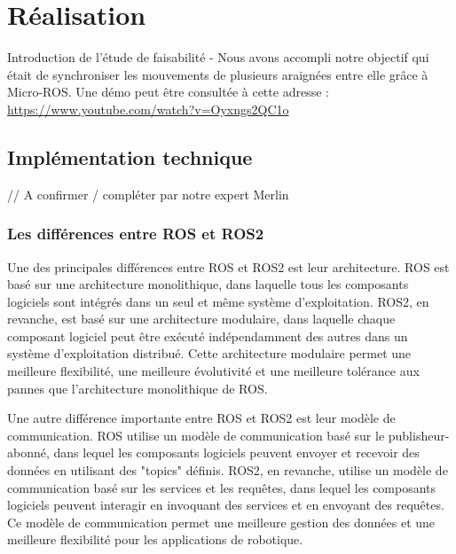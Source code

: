 	\chapter{Réalisation}

Introduction de l'étude de faisabilité - Nous avons accompli notre objectif qui était de synchroniser les mouvements de plusieurs araignées entre elle grâce à Micro-ROS.
Une démo peut être consultée à cette adresse : \url{https://www.youtube.com/watch?v=Oyxngs2QC1o}

	
		\section{Implémentation technique}

// A confirmer / compléter par notre expert Merlin

			\subsection{Les différences entre ROS et ROS2}

Une des principales différences entre ROS et ROS2 est leur architecture. ROS est basé sur une architecture monolithique, 
dans laquelle tous les composants logiciels sont intégrés dans un seul et même système d'exploitation. 
ROS2, en revanche, est basé sur une architecture modulaire, dans laquelle chaque composant logiciel peut être exécuté 
indépendamment des autres dans un système d'exploitation distribué. Cette architecture modulaire permet une meilleure flexibilité, 
une meilleure évolutivité et une meilleure tolérance aux pannes que l'architecture monolithique de ROS. 
\linebreak

Une autre différence importante entre ROS et ROS2 est leur modèle de communication. ROS utilise un modèle de communication basé 
sur le publisheur-abonné, dans lequel les composants logiciels peuvent envoyer et recevoir des données en utilisant des "topics" définis. 
ROS2, en revanche, utilise un modèle de communication basé sur les services et les requêtes, dans lequel les composants logiciels peuvent 
interagir en invoquant des services et en envoyant des requêtes. Ce modèle de communication permet une meilleure gestion des données et 
une meilleure flexibilité pour les applications de robotique. 
\linebreak

